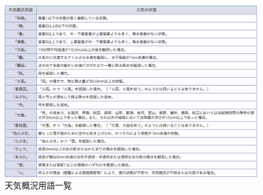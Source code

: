 \begin{figure}[hb]
\centering
\includegraphics[scale=0.5]{wether.png}
 \caption{天気概況用語一覧}
\end{figure}
